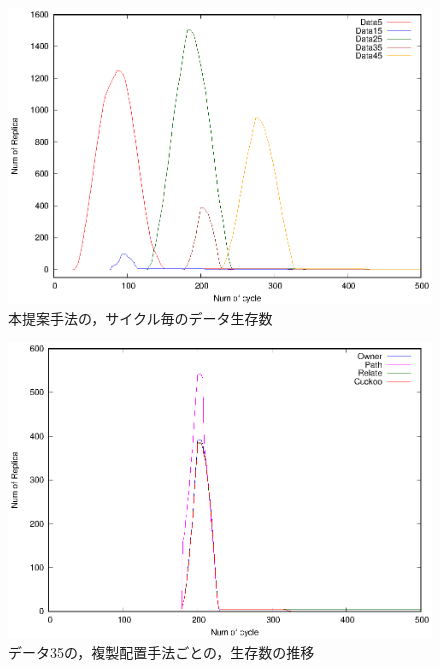 \documentclass[11pt]{jreport}
\begin{document}
\begin{figure}[H]
	\begin{center}
		\includegraphics[width=15.0cm]{./figure/cuckoo_counter.eps}
	\end{center}
	\caption{本提案手法の，サイクル毎のデータ生存数}
	\label{fig:cuckoo_c}
\end{figure}

\begin{figure}[H]
	\begin{center}
		\includegraphics[width=15.0cm]{./figure/counter_comp.eps}
	\end{center}
	\caption{データ35の，複製配置手法ごとの，生存数の推移}
	\label{fig:counter_comp}
\end{figure}
\end{document}
